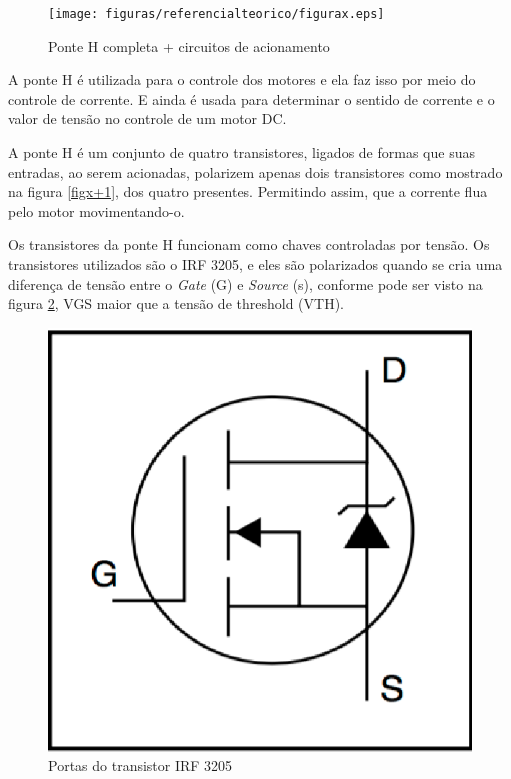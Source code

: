 \begin{figure}[!htb]
	\centering
	\texttt{[image: figuras/referencialteorico/figurax.eps]}
	\caption{Ponte H completa + circuitos de acionamento}
	\label{figx}
\end{figure}

A ponte H é utilizada para o controle dos motores e ela faz isso por meio do controle de corrente. E ainda é usada para determinar o sentido de corrente e o valor de tensão no controle de um motor DC.

A ponte H é um conjunto de quatro transistores, ligados de formas que suas entradas, ao serem acionadas, polarizem apenas dois transistores como mostrado na figura \ref{figx+1}, dos quatro presentes. Permitindo assim, que a corrente flua pelo motor movimentando-o.


Os transistores da ponte H funcionam como chaves controladas por tensão. Os transistores utilizados são o IRF 3205, e eles são polarizados quando se cria uma diferença de tensão entre o \textit{Gate} (G) e \textit{Source} (s), conforme pode ser visto na figura \ref{fig:portas_transistor_irf}, VGS maior que a tensão de threshold (VTH).

\begin{figure}[!htb]
	\centering
	\includegraphics[keepaspectratio=true,scale=0.8]{figuras/referencialteorico/portas_irf_3205}
	\caption{Portas do transistor IRF 3205 \cite{datasheet_irf_3205}}
	\label{fig:portas_transistor_irf}
\end{figure}

